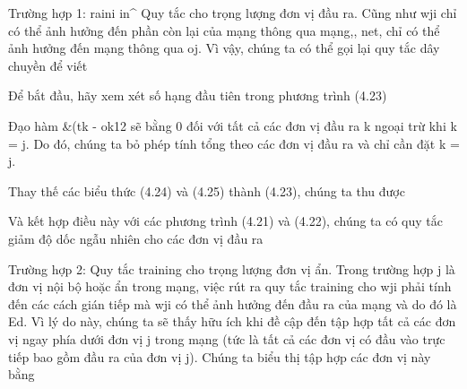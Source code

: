 Trường hợp 1: raini in\textasciicircum{} Quy tắc cho trọng lượng đơn vị đầu ra. Cũng như wji chỉ có thể ảnh hưởng đến phần còn lại của mạng thông qua mạng,, net, chỉ có thể ảnh hưởng đến mạng thông qua oj. Vì vậy, chúng ta có thể gọi lại quy tắc dây chuyền để viết

Để bắt đầu, hãy xem xét số hạng đầu tiên trong phương trình (4.23)

Đạo hàm \&(tk - ok12 sẽ bằng 0 đối với tất cả các đơn vị đầu ra k ngoại trừ khi k = j. Do đó, chúng ta bỏ phép tính tổng theo các đơn vị đầu ra và chỉ cần đặt k = j.

Thay thế các biểu thức (4.24) và (4.25) thành (4.23), chúng ta thu được

Và kết hợp điều này với các phương trình (4.21) và (4.22), chúng ta có quy tắc giảm độ dốc ngẫu nhiên cho các đơn vị đầu ra

Trường hợp 2: Quy tắc training cho trọng lượng đơn vị ẩn. Trong trường hợp j là đơn vị nội bộ hoặc ẩn trong mạng, việc rút ra quy tắc training cho wji phải tính đến các cách gián tiếp mà wji có thể ảnh hưởng đến đầu ra của mạng và do đó là Ed. Vì lý do này, chúng ta sẽ thấy hữu ích khi đề cập đến tập hợp tất cả các đơn vị ngay phía dưới đơn vị j trong mạng (tức là tất cả các đơn vị có đầu vào trực tiếp bao gồm đầu ra của đơn vị j). Chúng ta biểu thị tập hợp các đơn vị này bằng

